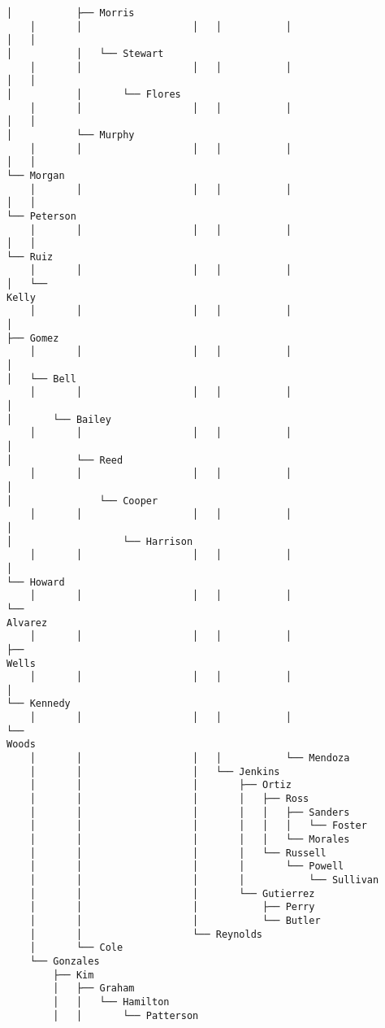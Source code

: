 \documentclass[11pt]{article}
\begin{document}
\begin{Verbatim}[commandchars=\\\{\}]
│           ├── Morris
    │       │                   │   │           │                       │   │
│           │   └── Stewart
    │       │                   │   │           │                       │   │
│           │       └── Flores
    │       │                   │   │           │                       │   │
│           └── Murphy
    │       │                   │   │           │                       │   │
└── Morgan
    │       │                   │   │           │                       │   │
└── Peterson
    │       │                   │   │           │                       │   │
└── Ruiz
    │       │                   │   │           │                       │   └──
Kelly
    │       │                   │   │           │                       │
├── Gomez
    │       │                   │   │           │                       │
│   └── Bell
    │       │                   │   │           │                       │
│       └── Bailey
    │       │                   │   │           │                       │
│           └── Reed
    │       │                   │   │           │                       │
│               └── Cooper
    │       │                   │   │           │                       │
│                   └── Harrison
    │       │                   │   │           │                       │
└── Howard
    │       │                   │   │           │                       └──
Alvarez
    │       │                   │   │           │                           ├──
Wells
    │       │                   │   │           │                           │
└── Kennedy
    │       │                   │   │           │                           └──
Woods
    │       │                   │   │           └── Mendoza
    │       │                   │   └── Jenkins
    │       │                   │       ├── Ortiz
    │       │                   │       │   ├── Ross
    │       │                   │       │   │   ├── Sanders
    │       │                   │       │   │   │   └── Foster
    │       │                   │       │   │   └── Morales
    │       │                   │       │   └── Russell
    │       │                   │       │       └── Powell
    │       │                   │       │           └── Sullivan
    │       │                   │       └── Gutierrez
    │       │                   │           ├── Perry
    │       │                   │           └── Butler
    │       │                   └── Reynolds
    │       └── Cole
    └── Gonzales
        ├── Kim
        │   ├── Graham
        │   │   └── Hamilton
        │   │       └── Patterson

\end{Verbatim}
\end{document}

